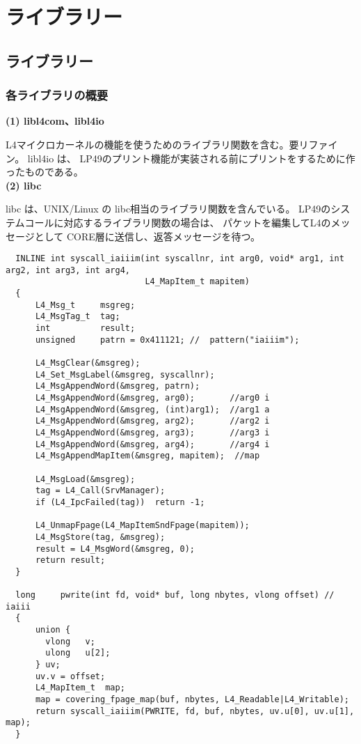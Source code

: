 {\newpage
\part{ライブラリー}

\chapter{ライブラリー}

\section{各ライブラリの概要}

{\bf\flushleft  (1) libl4com、libl4io} 

    L4マイクロカーネルの機能を使うためのライブラリ関数を含む。要リファイン。
    libl4io は、 LP49のプリント機能が実装される前にプリントをするために作ったものである。
\\

{\bf\flushleft  (2) libc}

  libc は、UNIX/Linux の libc相当のライブラリ関数を含んでいる。
  LP49のシステムコールに対応するライブラリ関数の場合は、
パケットを編集してL4のメッセージとして CORE層に送信し、返答メッセージを待つ。

{\small
\begin{verbatim}
  INLINE int syscall_iaiiim(int syscallnr, int arg0, void* arg1, int arg2, int arg3, int arg4,
                            L4_MapItem_t mapitem)
  {
      L4_Msg_t     msgreg;
      L4_MsgTag_t  tag;
      int          result;
      unsigned     patrn = 0x411121; //  pattern("iaiiim");

      L4_MsgClear(&msgreg);
      L4_Set_MsgLabel(&msgreg, syscallnr);
      L4_MsgAppendWord(&msgreg, patrn);        
      L4_MsgAppendWord(&msgreg, arg0);       //arg0 i
      L4_MsgAppendWord(&msgreg, (int)arg1);  //arg1 a
      L4_MsgAppendWord(&msgreg, arg2);       //arg2 i
      L4_MsgAppendWord(&msgreg, arg3);       //arg3 i
      L4_MsgAppendWord(&msgreg, arg4);       //arg4 i
      L4_MsgAppendMapItem(&msgreg, mapitem);  //map
  
      L4_MsgLoad(&msgreg);
      tag = L4_Call(SrvManager);
      if (L4_IpcFailed(tag))  return -1; 
  
      L4_UnmapFpage(L4_MapItemSndFpage(mapitem)); 
      L4_MsgStore(tag, &msgreg);
      result = L4_MsgWord(&msgreg, 0); 
      return result;
  }
  
  long     pwrite(int fd, void* buf, long nbytes, vlong offset) // iaiii
  {
      union {
        vlong   v;
        ulong   u[2];
      } uv;
      uv.v = offset;   
      L4_MapItem_t  map; 
      map = covering_fpage_map(buf, nbytes, L4_Readable|L4_Writable);
      return syscall_iaiiim(PWRITE, fd, buf, nbytes, uv.u[0], uv.u[1], map);  
  }
\end{verbatim}
}


}
